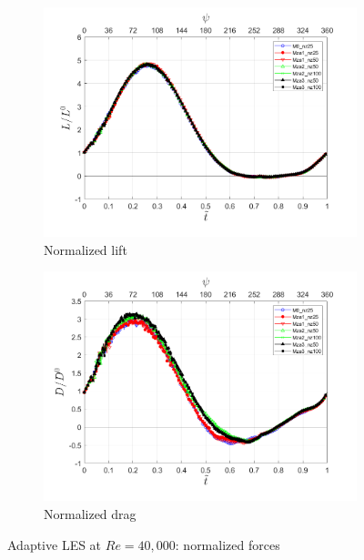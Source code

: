 \begin{figure}[H]
\centering

\begin{subfigure}[b]{0.7\textwidth}
\centering
\includegraphics[width=1\textwidth]{figures/zonal_adapt_results/force_response/Lift.png}
\caption{Normalized lift}
\label{fig:lift_zonal_adapt}
\end{subfigure}
\begin{subfigure}[b]{0.7\textwidth}
\centering
\includegraphics[width=1\textwidth]{figures/zonal_adapt_results/force_response/Drag.png}
\caption{Normalized drag}
\label{fig:drag_zonal_adapt}
\end{subfigure}

\label{fig:force_response_zonal_adapt}
\caption{Adaptive LES at $Re=40,000$: normalized forces}
\end{figure}